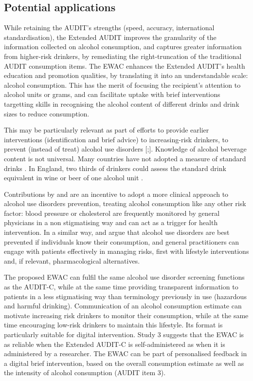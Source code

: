 \documentclass[]{article}
\begin{document}
\hypertarget{potential-applications}{%
\subsection{Potential applications}\label{potential-applications}}

While retaining the AUDIT's strengths (speed, accuracy, international
standardisation), the Extended AUDIT improves the granularity of the
information collected on alcohol consumption, and captures greater
information from higher-risk drinkers, by remediating the
right-truncation of the traditional AUDIT consumption items. The EWAC
enhances the Extended AUDIT's health education and promotion qualities,
by translating it into an understandable scale: alcohol consumption.
This has the merit of focusing the recipient's attention to alcohol
units or grams, and can facilitate uptake with brief interventions
targetting skills in recognising the alcohol content of different drinks
and drink sizes to reduce consumption.

This may be particularly relevant as part of efforts to provide earlier
interventions (identification and brief advice) to increasing-risk
drinkers, to prevent (instead of treat) alcohol use disorders
{[}\citep{Lavoie2010};{]}. Knowledge of alcohol beverage content is not
universal. Many countries have not adopted a measure of standard drinks
\citep{Kalinowski2016}. In England, two thirds of drinkers could assess
the standard drink equivalent in wine or beer of one alcohol unit
\citep{ONS2009}.

Contributions by \citep{Nutt2014} and \citep{Rehm2016} are an incentive
to adopt a more clinical approach to alcohol use disorders prevention,
treating alcohol consumption like any other risk factor: blood pressure
or cholesterol are frequently monitored by general physicians in a non
stigmatising way and can act as a trigger for health intervention. In a
similar way, \citep{Nutt2014} and \citep{Rehm2016} argue that alcohol
use disorders are best prevented if individuals know their consumption,
and general practitioners can engage with patients effectively in
managing risks, first with lifestyle interventions and, if relevant,
pharmacological alternatives.

The proposed EWAC can fulfil the same alcohol use disorder screening
functions as the AUDIT-C, while at the same time providing transparent
information to patients in a less stigmatising way than terminology
previously in use (hazardous and harmful drinking). Communication of an
alcohol consumption estimate can motivate increasing risk drinkers to
monitor their consumption, while at the same time encouraging low-risk
drinkers to maintain this lifestyle. Its format is particularly suitable
for digital intervention. Study 3 suggests that the EWAC is as reliable
when the Extended AUDIT-C is self-administered as when it is
administered by a researcher. The EWAC can be part of personalised
feedback in a digital brief intervention, based on the overall
consumption estimate as well as the intensity of alcohol consumption
(AUDIT item 3).
\end{document}
